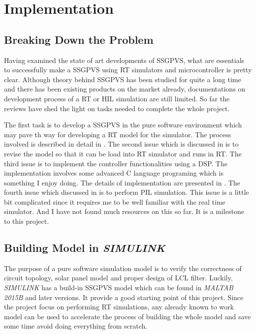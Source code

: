 \chapter{Implementation}\label{ch:problem}
\section{Breaking Down the Problem}
Having examined the state of art developments of \gls{SSGPVS}, what are essentials to successfully make a \gls{SSGPVS} using \gls{RT} simulators and microcontroller is pretty clear. Although theory behind \gls{SSGPVS}  has been studied for quite a long time and there has been existing products on the market already, documentations on development process of a \gls{RT} or \gls{HIL} simulation are still limited. So far the reviews have shed the light on tasks needed to complete the whole project. 

The first task is to develop a \gls{SSGPVS} in the pure software environment which may pave th way for developing a \gls{RT} model for the simulator. The process involved is described in detail in . The second issue which is discussed in  is to revise the model so that it can be load into \gls{RT} simulator and runs in \gls{RT}. 
The third issue is to implement the controller functionalities using a \gls{DSP}. The implementation involves some advanced C language programing which is something I enjoy doing. The details of implementation are presented in .
The fourth issue which discussed in  is to perform \gls{PIL} simulation. This issue is a little bit complicated since it requires me to be well familiar with the real time simulator. And I have not found much resources on this so far. It is a milestone to this project.
\section{Building Model in \textit{SIMULINK}}\label{sec:build_simulink}
The purpose of a pure software simulation model is to verify the correctness of circuit topology, solar panel model and proper design of LCL filter. Luckily, \textit{SIMULINK} has a build-in \gls{SSGPVS} model which can be found in \textit{MALTAB 2015B} and later versions\cite{solar_buildin_model}. It provide a good starting point of this project. Since the project focus on performing \gls{RT} simulations, any already known to work model can be used to accelerate the process of building the whole model and save some time avoid doing everything from scratch. 

